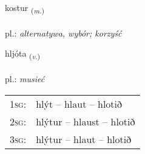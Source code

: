\documentclass[frontgrid, backgrid]{flacards}\usepackage[]{graphicx}\usepackage[]{xcolor}
\begin{document}
\renewcommand{\blhead}{\vskip5pt {\small\bfseries\footnotesize Nafnorð | rzeczownik }}
\renewcommand{\bcfoot}{\vskip5pt \hspace{2pt}{\small\bfseries\footnotesize 1K}}


{kostur \small{\textsubscript{(\textit{m.})}} \\[1ex] %
\textphonetic{[kʰɔstʏr]} \\
pl.: \emph{alternatywa, wybór; korzyść} \\  [2ex]
\renewcommand*{\arraystretch}{0.8}
}

\renewcommand{\flhead}{\vskip5pt \fboxsep=0pt {\small\bfseries\footnotesize Sagnorð | czasownik}}
\renewcommand{\fcfoot}{\vskip5pt \fboxsep=0pt \hspace{2pt}{\small\bfseries\footnotesize 1K}}

\renewcommand{\blhead}{\vskip5pt {\small\bfseries\footnotesize Sagnorð | czasownik }}
\renewcommand{\bcfoot}{\vskip5pt \hspace{2pt}{\small\bfseries\footnotesize 1K}}


{hljóta \small{\textsubscript{(\textit{v.})}} \\[1ex] %
\textphonetic{[l̥jouːta]} \\
pl.: \emph{musieć} \\  [2ex]
\renewcommand*{\arraystretch}{0.8}
\begin{tabular}{p{1cm}l}
\textsc{1sg}: & hlýt -- hlaut -- hlotið \\ 
\textsc{2sg}: & hlýtur -- hlaust -- hlotið \\ 
\textsc{3sg}: & hlýtur -- hlaut -- hlotið \\ 
\end{tabular}
}
\end{document}
